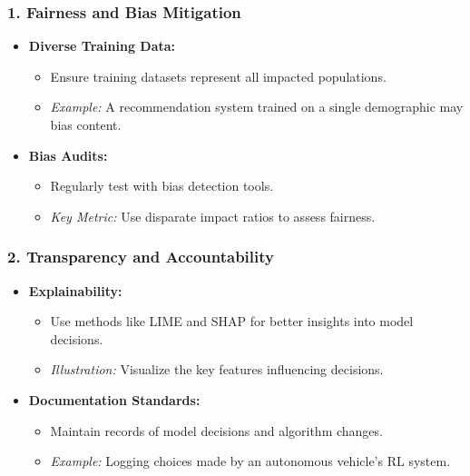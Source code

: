 \documentclass{beamer}
\begin{document}
\begin{frame}[fragile]
    \frametitle{1. Fairness and Bias Mitigation}
    \begin{itemize}
        \item \textbf{Diverse Training Data:}
        \begin{itemize}
            \item Ensure training datasets represent all impacted populations.
            \item \textit{Example:} A recommendation system trained on a single demographic may bias content.
        \end{itemize}
        
        \item \textbf{Bias Audits:}
        \begin{itemize}
            \item Regularly test with bias detection tools.
            \item \textit{Key Metric:} Use disparate impact ratios to assess fairness.
        \end{itemize}
    \end{itemize}
\end{frame}

\begin{frame}[fragile]
    \frametitle{2. Transparency and Accountability}
    \begin{itemize}
        \item \textbf{Explainability:}
        \begin{itemize}
            \item Use methods like LIME and SHAP for better insights into model decisions.
            \item \textit{Illustration:} Visualize the key features influencing decisions.
        \end{itemize}

        \item \textbf{Documentation Standards:}
        \begin{itemize}
            \item Maintain records of model decisions and algorithm changes.
            \item \textit{Example:} Logging choices made by an autonomous vehicle's RL system.
        \end{itemize}
    \end{itemize}
\end{frame}
\end{document}
